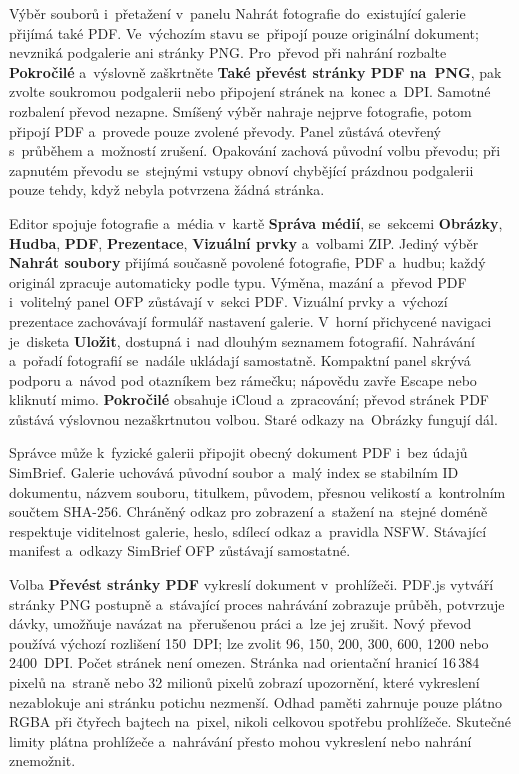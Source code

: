 \documentclass[11pt,a4paper]{article}
\newcommand{\ui}[1]{\textbf{#1}}
\begin{document}
Výběr souborů i~přetažení v~panelu Nahrát fotografie do~existující galerie
přijímá také PDF. Ve~výchozím stavu se~připojí pouze originální dokument;
nevzniká podgalerie ani stránky PNG. Pro~převod při nahrání rozbalte
\ui{Pokročilé} a~výslovně zaškrtněte \ui{Také převést stránky PDF na~PNG}, pak
zvolte soukromou podgalerii nebo připojení stránek na~konec a~DPI. Samotné
rozbalení převod nezapne. Smíšený výběr nahraje nejprve fotografie, potom
připojí PDF a~provede pouze zvolené převody. Panel zůstává otevřený s~průběhem
a~možností zrušení. Opakování zachová původní volbu převodu; při zapnutém
převodu se~stejnými vstupy obnoví chybějící prázdnou podgalerii pouze tehdy,
když nebyla potvrzena žádná stránka.


Editor spojuje fotografie a~média v~kartě \ui{Správa médií}, se~sekcemi
\ui{Obrázky}, \ui{Hudba}, \ui{PDF}, \ui{Prezentace}, \ui{Vizuální prvky}
a~volbami ZIP. Jediný výběr \ui{Nahrát soubory} přijímá současně povolené
fotografie, PDF a~hudbu; každý originál zpracuje automaticky podle typu.
Výměna, mazání a~převod PDF i~volitelný panel OFP zůstávají v~sekci PDF.
Vizuální prvky a~výchozí prezentace zachovávají formulář nastavení galerie.
V~horní přichycené navigaci je~disketa \ui{Uložit}, dostupná i~nad dlouhým
seznamem fotografií. Nahrávání a~pořadí fotografií se~nadále ukládají
samostatně.
Kompaktní panel skrývá podporu a~návod pod otazníkem bez rámečku; nápovědu
zavře Escape nebo kliknutí mimo. \ui{Pokročilé} obsahuje iCloud a~zpracování;
převod stránek PDF zůstává výslovnou nezaškrtnutou volbou. Staré odkazy
na~Obrázky fungují dál.

Správce může k~fyzické galerii připojit obecný dokument PDF i~bez údajů
SimBrief. Galerie uchovává původní soubor a~malý index se stabilním ID
dokumentu, názvem souboru, titulkem, původem, přesnou velikostí a~kontrolním
součtem SHA-256. Chráněný odkaz pro zobrazení a~stažení na~stejné doméně
respektuje viditelnost galerie, heslo, sdílecí odkaz a~pravidla NSFW. Stávající
manifest a~odkazy SimBrief OFP zůstávají samostatné.

Volba \ui{Převést stránky PDF} vykreslí dokument v~prohlížeči. PDF.js vytváří
stránky PNG postupně a~stávající proces nahrávání zobrazuje průběh, potvrzuje
dávky, umožňuje navázat na~přerušenou práci a~lze jej zrušit. Nový převod
používá výchozí rozlišení 150~DPI; lze zvolit 96, 150, 200, 300, 600, 1200 nebo
2400~DPI. Počet stránek není omezen. Stránka nad orientační hranicí 16\,384
pixelů na~straně nebo 32 milionů pixelů zobrazí upozornění, které vykreslení
nezablokuje ani stránku potichu nezmenší. Odhad paměti zahrnuje pouze plátno
RGBA při čtyřech bajtech na~pixel, nikoli celkovou spotřebu prohlížeče. Skutečné
limity plátna prohlížeče a~nahrávání přesto mohou vykreslení nebo nahrání
znemožnit.
\end{document}
